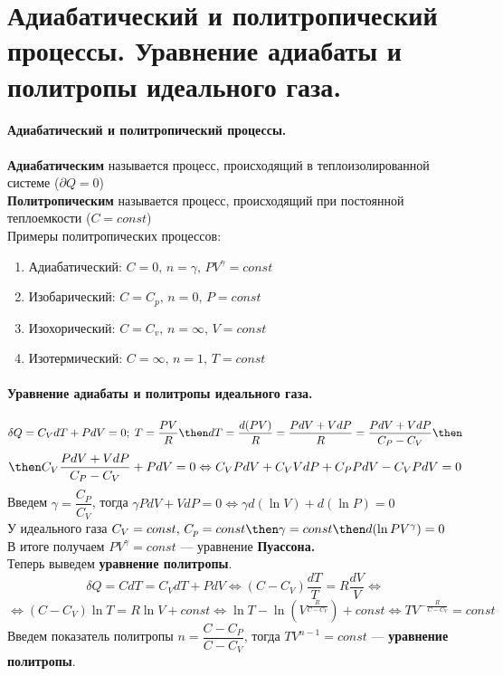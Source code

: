 \section{\normalsize Адиабатический и политропический процессы. Уравнение адиабаты и политропы идеального газа.}
\paragraph{Адиабатический и политропический процессы.} \textbf{Адиабатическим} называется процесс, происходящий в теплоизолированной системе ($\partial Q = 0$)\\
\textbf{Политропическим} называется процесс, происходящий при постоянной теплоемкости ($C=const$)\\
Примеры политропических процессов:
\begin{enumerate}
	\item Адиабатический: $C=0,\,n=\gamma,\,PV^\gamma=const$
	\item Изобарический: $C=C_p,\,n=0,\,P=const$
	\item Изохорический: $C=C_v,\,n=\infty,\,V=const$
	\item Изотермический: $C=\infty,\,n=1,\,T=const$
\end{enumerate}
\paragraph{Уравнение адиабаты и политропы идеального газа.}
$$ \delta Q = C_VdT + PdV =0;\; T =\dfrac{PV}{R} \then dT = \dfrac{d(PV)}{R}=\dfrac{PdV+VdP}{R}=\dfrac{PdV+VdP}{C_P-C_V}\then $$
$$\then C_V \dfrac{PdV+VdP}{C_P-C_V}+PdV = 0 \Leftrightarrow C_VPdV+C_VVdP+C_PPdV-C_VPdV=0$$
Введем $\gamma=\dfrac{C_P}{C_V}$, тогда $\gamma PdV+VdP = 0 \Leftrightarrow \gamma d(\ln V)+d(\ln P) = 0$\\
У идеального газа $C_V = const,\,C_p=const\then\gamma=const\then d(\ln PV^\gamma)=0$\\
В итоге получаем $PV^\gamma=const$ --- уравнение \textbf{Пуассона.}\\

Теперь выведем \textbf{уравнение политропы}.
$$ \delta Q = CdT = C_VdT+PdV \Leftrightarrow (C-C_V)\dfrac{dT}{T}=R\dfrac{dV}{V} \Leftrightarrow$$
$$\Leftrightarrow (C-C_V)\ln T = R\ln V + const \Leftrightarrow \ln T - \ln \left(V^{\tfrac{R}{C-C_V}}\right) + const \Leftrightarrow TV^{-\tfrac{R}{C-C_V}}=const $$
Введем показатель политропы $n = \dfrac{C-C_P}{C-C_V}$, тогда $TV^{n-1}=const$ --- \textbf{уравнение политропы}.
